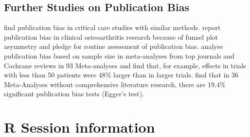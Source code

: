 \documentclass[11pt,a4paper,twoside]{book}\usepackage[]{graphicx}\usepackage[]{color}
\begin{document}
\subsection{Further Studies on Publication Bias}
\citealp{Zhang.2013} find publication bias in critical care studies with similar methods. \citealp{Nusch} report publication bias in clinical osteoarthritis research because of funnel plot asymmetry and pledge for routine assessment of publication bias. \citealp{Dechartres.2013} analyse publication bias based on sample size in meta-analyses from top journals and Cochrane reviews in 93 Meta-analyses and find that, for example, effects in trials with less than 50 patients were 48\% larger than in larger trials. \citealp{Onishi.2014} find that in 36 Meta-Analyses without comprehensive literature research, there are 19.4\% significant publication bias tests (Egger's test).



\section{R Session information}
\end{document}
